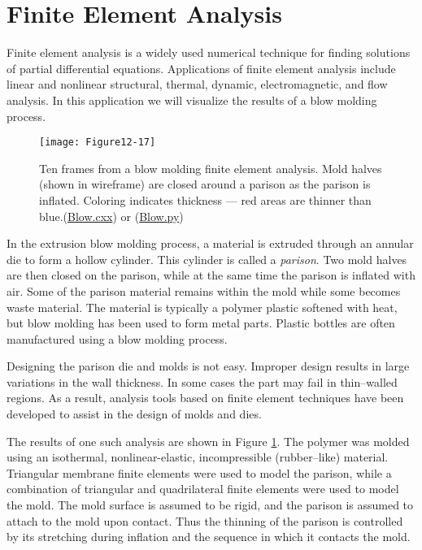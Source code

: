 \section{Finite Element Analysis}
Finite element analysis is a widely used numerical technique for finding solutions of partial differential equations. Applications of finite element analysis include linear and nonlinear structural, thermal, dynamic, electromagnetic, and flow analysis. In this application we will visualize the results of a blow molding process.

\begin{figure}[!htb]
	\centering
	\texttt{[image: Figure12-17]}
	\caption{Ten frames from a blow molding finite element analysis. Mold halves (shown in wireframe) are closed around a parison as the parison is inflated. Coloring indicates thickness --- red areas are thinner than blue.(\href{https://lorensen.github.io/VTKExamples/site/Cxx/Visualization/Blow/}{Blow.cxx}) or (\href{https://lorensen.github.io/VTKExamples/site/Python/Visualization/Blow/}{Blow.py})}
	\label{fig:Figure12-17}
\end{figure}

In the extrusion blow molding process, a material is extruded through an annular die to form a hollow cylinder. This cylinder is called a \emph{parison}. Two mold halves are then closed on the parison, while at the same time the parison is inflated with air. Some of the parison material remains within the mold while some becomes waste material. The material is typically a polymer plastic softened with heat, but blow molding has been used to form metal parts. Plastic bottles are often manufactured using a blow molding process.

Designing the parison die and molds is not easy. Improper design results in large variations in the wall thickness. In some cases the part may fail in thin--walled regions. As a result, analysis tools based on finite element techniques have been developed to assist in the design of molds and dies.

The results of one such analysis are shown in Figure \ref{fig:Figure12-17}. The polymer was molded using an isothermal, nonlinear-elastic, incompressible (rubber--like) material. Triangular membrane finite elements were used to model the parison, while a combination of triangular and quadrilateral finite elements were used to model the mold. The mold surface is assumed to be rigid, and the parison is assumed to attach to the mold upon contact. Thus the thinning of the parison is controlled by its stretching during inflation and the sequence in which it contacts the mold.

